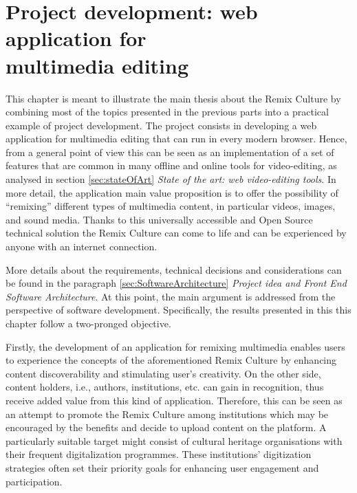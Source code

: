 \chapter{Project development: web application for \\ multimedia editing}
\label{ch:ch3_ProjectDevelopment}


This chapter is meant to illustrate the main thesis about the Remix Culture by combining most of the topics presented in the previous parts into a practical example of project development. The project consists in developing a web application for multimedia editing that can run in every modern browser. Hence, from a general point of view this can be seen as an implementation of a set of features that are common in many offline and online tools for video-editing, as analysed in section \ref{sec:stateOfArt} \emph{State of the art: web video-editing tools}. In more detail, the application main value proposition is to offer the possibility of “remixing” different types of multimedia content, in particular videos, images, and sound media. Thanks to this universally accessible and Open Source technical solution the Remix Culture can come to life and can be experienced by anyone with an internet connection.

More details about the requirements, technical decisions and considerations can be found in the paragraph \ref{sec:SoftwareArchitecture} \emph{Project idea and Front End Software Architecture}. At this point, the main argument is addressed from the perspective of software development. Specifically, the results presented in this this chapter follow a two-pronged objective.

Firstly, the development of an application for remixing multimedia enables users to experience the concepts of the aforementioned Remix Culture by enhancing content discoverability and stimulating user’s creativity. On the other side, content holders, i.e., authors, institutions, etc. can gain in recognition, thus receive added value from this kind of application. Therefore, this can be seen as an attempt to promote the Remix Culture among institutions which may be encouraged by the benefits and decide to upload content on the platform. A particularly suitable target might consist of cultural heritage organisations with their frequent digitalization programmes. These institutions’ digitization strategies often set their priority goals for enhancing user engagement and participation.


